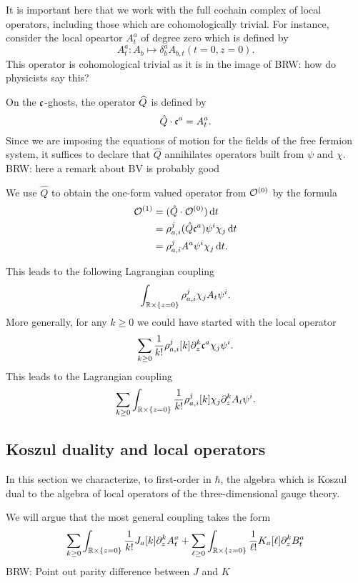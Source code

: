\documentclass[11pt]{amsart}
\def\brian#1{{\textcolor{blue!65!red}{BRW: {#1}}}}
\begin{document}
It is important here that we work with the full cochain complex of local operators, including those which are cohomologically trivial. 
For instance, consider the local opeartor $A^a_t$ of degree zero which is defined by
\[
A^a_{t} \colon A_b \mapsto \delta^a_b A_{b,t} (t=0, z=0) .
\]
This operator is cohomological trivial as it is in the image of \brian{how do physicists say this?}

On the $\fc$-ghosts, the operator $\Hat{Q}$ is defined by 
\[
\hat{Q} \cdot \fc^a = A^a_t  .
\]
Since we are imposing the equations of motion for the fields of the free fermion system, it suffices to declare that $\hat{Q}$ annihilates operators built from $\psi$ and $\chi$. 
\brian{here a remark about BV is probably good}

We use $\hat{Q}$ to obtain the one-form valued operator from $\cO^{(0)}$ by the formula
\begin{align*}
\cO^{(1)} & = (\hat{Q} \cdot \cO^{(0)}) \, \d t \\
& = \rho_{a,i}^j (\hat{Q} \fc^a) \psi^i \chi_j \, \d t \\ 
& = \rho_{a,i}^j A^a \psi^i \chi_j \, \d t .
\end{align*}

This leads to the following Lagrangian coupling
\[
\int_{\RR \times \{z=0\}} \rho_{a,i}^j \chi_j  A_t \psi^i  .
\]
More generally, for any $k \geq 0$ we could have started with the local operator 
\[
\sum_{k \geq 0} \frac1{k!} \rho_{a,i}^j [k] \partial_z^k \fc^a \chi_j \psi^i .
\]
This leads to the Lagrangian coupling
\[
\sum_{k \geq 0} \int_{\RR \times \{z=0\}} \frac{1}{k!} \rho_{a,i}^j[k] \chi_j \partial_z^k A_t \psi^i .
\]



\subsection*{Koszul duality and local operators}

In this section we characterize, to first-order in $\hbar$, the algebra which is Koszul dual to the algebra of local operators of the three-dimensional gauge theory.

We will argue that the most general coupling takes the form
\[
\sum_{k \geq 0} \int_{\RR \times \{z=0\}} \frac{1}{k!} J_a [k] \partial_z^k A^a_t + \sum_{\ell \geq 0} \int_{\RR \times \{z=0\}} \frac{1}{\ell!} K_a[\ell] \partial_z^k B_t^a 
\] 
\brian{Point out parity difference between $J$ and $K$}
\end{document}

